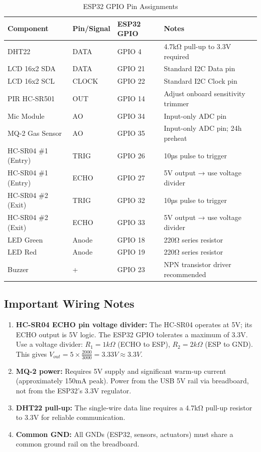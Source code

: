 \documentclass[12pt,a4paper]{article}
\begin{document}
\begin{table}[H]
\centering
\caption{ESP32 GPIO Pin Assignments}
\begin{tabular}{l l l p{5cm}}
\toprule
\textbf{Component} & \textbf{Pin/Signal} & \textbf{ESP32 GPIO} & \textbf{Notes} \\
\midrule
DHT22             & DATA   & GPIO 4  & 4.7kΩ pull-up to 3.3V required \\
LCD 16x2 SDA      & DATA   & GPIO 21 & Standard I2C Data pin \\
LCD 16x2 SCL      & CLOCK  & GPIO 22 & Standard I2C Clock pin \\
PIR HC-SR501      & OUT    & GPIO 14 & Adjust onboard sensitivity trimmer \\
Mic Module        & AO     & GPIO 34 & Input-only ADC pin \\
MQ-2 Gas Sensor   & AO     & GPIO 35 & Input-only ADC pin; 24h preheat \\
HC-SR04 \#1 (Entry) & TRIG & GPIO 26 & 10µs pulse to trigger \\
HC-SR04 \#1 (Entry) & ECHO & GPIO 27 & 5V output → use voltage divider \\
HC-SR04 \#2 (Exit)  & TRIG & GPIO 32 & 10µs pulse to trigger \\
HC-SR04 \#2 (Exit)  & ECHO & GPIO 33 & 5V output → use voltage divider \\
LED Green         & Anode  & GPIO 18 & 220Ω series resistor \\
LED Red           & Anode  & GPIO 19 & 220Ω series resistor \\
Buzzer            & +      & GPIO 23 & NPN transistor driver recommended \\
\bottomrule
\end{tabular}
\end{table}

\subsection{Important Wiring Notes}

\begin{enumerate}[leftmargin=1.5cm]
  \item \textbf{HC-SR04 ECHO pin voltage divider:} The HC-SR04 operates at 5V; its ECHO output is 5V logic. The ESP32 GPIO tolerates a maximum of 3.3V. Use a voltage divider: $R_1 = 1k\Omega$ (ECHO to ESP), $R_2 = 2k\Omega$ (ESP to GND). This gives $V_{out} = 5 \times \frac{2000}{3000} = 3.33V \approx 3.3V$.
  
  \item \textbf{MQ-2 power:} Requires 5V supply and significant warm-up current (approximately 150mA peak). Power from the USB 5V rail via breadboard, not from the ESP32's 3.3V regulator.
  
  \item \textbf{DHT22 pull-up:} The single-wire data line requires a 4.7kΩ pull-up resistor to 3.3V for reliable communication.
  
  \item \textbf{Common GND:} All GNDs (ESP32, sensors, actuators) must share a common ground rail on the breadboard.
\end{enumerate}
\end{document}
